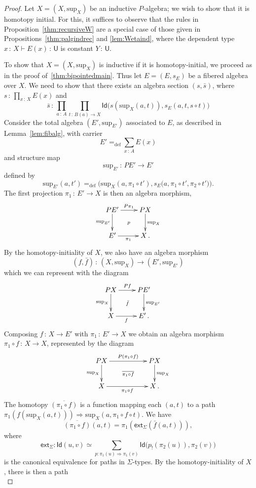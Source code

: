 \documentclass[10pt,a4paper,oneside,reqno]{amsart}
\theoremstyle{mythm}
\theoremstyle{mydef}
\theoremstyle{myrmk}
\newcommand{\defeq}{=_{\mathrm{def}}}
\newcommand{\co}{\,{:}\,}
\newcommand{\com}{\circ}
\newcommand{\ext}{\mathsf{ext}}
\newcommand{\idtodpair}{\ext_\Sigma}
\newcommand{\Id}{\mathsf{Id}}
\newcommand{\U}{\mathsf{U}}
\renewcommand{\sup}{\mathrm{sup}}
\begin{document}
\begin{proof}
Let $X = (X, \sup_X)$ be an inductive $P$-algebra; we wish to show that it is homotopy initial.
For this, it suffices to observe that the rules in Proposition~\ref{thm:recursiveW} are a special case of those given in Propositions~\ref{thm:palgindrec} and \ref{lem:Wetaind}, where the dependent type $x \co X \vdash E(x) \co \U$ is constant $Y \co \U$.

To show that $X = (X, \sup_X)$ is inductive if it is homotopy-initial, we proceed as in the proof of~\ref{thm:bipointedmain}. 
Thus let $E = (E, s_E)$ be a fibered algebra over $X$. We need to show that there
exists an algebra section $(s, \bar{s})$, where $s \co \prod_{x \co X} E(x)$ and 
\[ 
\bar{s} \co \prod_{a \co A} \prod_{t \co B(a) \to X} \Id \big( s(\sup_X(a,t)), s_E(a, t, s \circ t) \big)
\]
%
Consider the total algebra $(E', \sup_{E'})$ associated to $E$, as described in Lemma~\ref{lem:fibalg}, with carrier 
\[
E' \defeq \sum_{x \co A} E(x) 
\]
and structure map
\[
\sup_{E'} \co PE' \to E'
\]
defined by
\[
\sup_{E'}(a,t') \defeq \Big(\sup_X(a,\pi_1 \circ t'), s_E\big(a,\pi_1 \circ t', \pi_2 \circ t'\big)\Big) .
\]
The first projection $\pi_1 \co E' \to X$ is then an algebra morphism,
\[
\xymatrix{
PE' \ar[r]^{P\pi_1} \ar[d]_-{\sup_{E'}} \ar@{}[rd]|{p} & PX \ar[d]^{\sup_X} \\ 
E'  \ar[r]_-{\pi_1} & X \, .}
 \]
%
By the homotopy-initiality of $X$, we also have an algebra morphism 
\[
(f, \bar{f}) \co (X, \sup_X)  \to (E', \sup_{E'}) 
\]
which we can represent with the diagram
\[
\xymatrix{
PX \ar[r]^{Pf} \ar[d]_-{\sup_{X}} \ar@{}[rd]|{\bar{f}} & PE' \ar[d]^{\sup_{E'}} \\ 
X  \ar[r]_-{f} & E' \, .}
 \]
%
Composing $f \co X \to E'$ with $\pi_1 \co E' \to X$ we obtain an algebra morphism $\pi_1 \com f \co X \to X$, represented by the diagram
\[
\xymatrix{
PX \ar[rr]^{P(\pi_1 \com f)} \ar[d]_-{\sup_{X}} \ar@{}[rrd]|{\overline{\pi_1 \com f}} && PX \ar[d]^{\sup_{X}} \\ 
X  \ar[rr]_-{\pi_1 \com f} && X \, .}
 \]
%
The homotopy $\overline{(\pi_1 \com f)}$ is a function mapping each $(a,t)$ to
a path $\pi_1(f(\sup_X(a,t))) \Rightarrow \sup_X(a, \pi_1 \circ f \circ t)$. We have
\[
\overline{(\pi_1 \com f)}(a,t) = \pi_1(\idtodpair(\bar{f}(a,t))) ,
\]
where $$\idtodpair : \Id(u,v) \simeq \sum_{p : \pi_1(u) \Rightarrow \pi_1(v)} \Id\big(p_{!}(\pi_2(u)), \pi_2(v)\big)$$ is the canonical equivalence for paths in $\Sigma$-types. 
By the homotopy-initiality of $X$,  there is then a path
\begin{equation*}

\end{equation*}
\end{proof}
\end{document}
